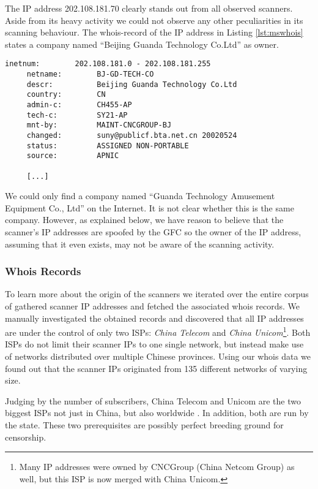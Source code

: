 \documentclass[runningheads,a4paper]{llncs}
\begin{document}
The IP address 202.108.181.70 clearly stands out from all observed scanners. Aside from its heavy
activity we could not observe any other peculiarities in its scanning behaviour. The whois-record of
the IP address in Listing \ref{lst:mswhois} states a company named ``Beijing Guanda Technology
Co.Ltd'' as owner.

\begin{lstlisting}[basicstyle=\footnotesize\ttfamily,caption={Whois-record of the master
scanner.},label={lst:mswhois},
captionpos=b]
     inetnum:        202.108.181.0 - 202.108.181.255
     netname:        BJ-GD-TECH-CO
     descr:          Beijing Guanda Technology Co.Ltd
     country:        CN
     admin-c:        CH455-AP
     tech-c:         SY21-AP
     mnt-by:         MAINT-CNCGROUP-BJ
     changed:        suny@publicf.bta.net.cn 20020524
     status:         ASSIGNED NON-PORTABLE
     source:         APNIC

     [...]
\end{lstlisting}

We could only find a company named ``Guanda Technology Amusement Equipment Co., Ltd'' on the
Internet. It is not clear whether this is the same company. However, as explained below, we have
reason to believe that the scanner's IP addresses are spoofed by the GFC so the owner of the IP
address, assuming that it even exists, may not be aware of the scanning activity.

\subsubsection{Whois Records}
To learn more about the origin of the scanners we iterated over the entire corpus of gathered
scanner IP addresses and fetched the associated whois records. We manually investigated the obtained
records and discovered that all IP addresses are under the control of only two ISPs: \emph{China
Telecom} and \emph{China Unicom}\footnote{Many IP addresses were owned by CNCGroup (China Netcom
Group) as well, but this ISP is now merged with China Unicom.}. Both ISPs do not limit their scanner
IPs to one single network, but instead make use of networks distributed over multiple Chinese
provinces. Using our whois data we found out that the scanner IPs originated from 135 different
networks of varying size.

Judging by the number of subscribers, China Telecom and Unicom are the two biggest ISPs not just in
China, but also worldwide \cite{chinaISP}. In addition, both are run by the state. These two
prerequisites are possibly perfect breeding ground for censorship.
\end{document}
